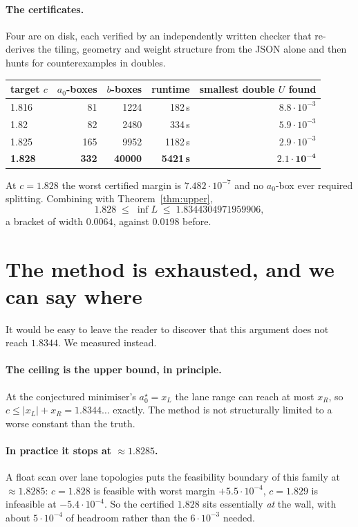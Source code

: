 \documentclass[11pt]{article}
\begin{document}
\paragraph{The certificates.} Four are on disk, each verified by an
independently written checker that re-derives the tiling, geometry and
weight structure from the JSON alone and then hunts for counterexamples
in doubles.

\begin{center}
\begin{tabular}{lrrrr}
\toprule
target $c$ & $a_0$-boxes & $b$-boxes & runtime & smallest double $U$ found \\
\midrule
1.816 & 81  & 1224  & 182\,s  & $8.8\cdot10^{-3}$ \\
1.82  & 82  & 2480  & 334\,s  & $5.9\cdot10^{-3}$ \\
1.825 & 165 & 9952  & 1182\,s & $2.9\cdot10^{-3}$ \\
\textbf{1.828} & \textbf{332} & \textbf{40000} & \textbf{5421\,s} & $\mathbf{2.1\cdot10^{-4}}$ \\
\bottomrule
\end{tabular}
\end{center}

At $c=1.828$ the worst certified margin is $7.482\cdot10^{-7}$ and no
$a_0$-box ever required splitting. Combining with
Theorem~\ref{thm:upper},
\[
  1.828 \;\le\; \inf L \;\le\; 1.8344304971959906 ,
\]
a bracket of width $0.0064$, against $0.0198$ before.

\section{The method is exhausted, and we can say where}\label{sec:exhaustion}

It would be easy to leave the reader to discover that this argument does
not reach $1.8344$. We measured instead.

\paragraph{The ceiling is the upper bound, in principle.} At the
conjectured minimiser's $a_0^\star=x_L$ the lane range can reach at most
$x_R$, so $c\le\lvert x_L\rvert+x_R=1.8344\ldots$ exactly. The method is
not structurally limited to a worse constant than the truth.

\paragraph{In practice it stops at $\approx1.8285$.} A float scan over
lane topologies puts the feasibility boundary of this family at
$\approx1.8285$: $c=1.828$ is feasible with worst margin
$+5.5\cdot10^{-4}$, $c=1.829$ is infeasible at $-5.4\cdot10^{-4}$. So the
certified $1.828$ sits essentially \emph{at} the wall, with about
$5\cdot10^{-4}$ of headroom rather than the $6\cdot10^{-3}$ needed.
\end{document}
